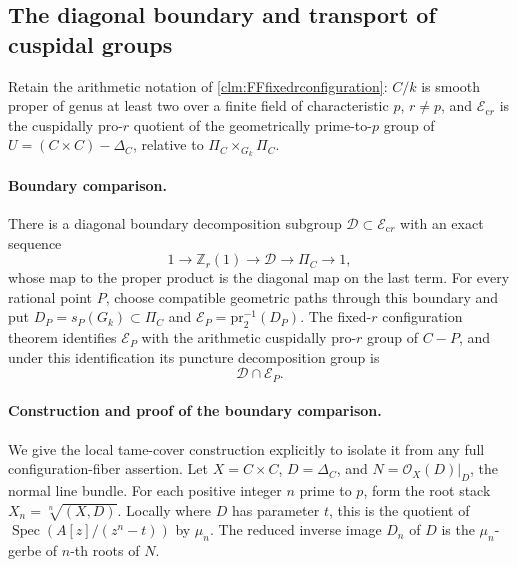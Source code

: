 \subsection{The diagonal boundary and transport of cuspidal groups}

Retain the arithmetic notation of
\ref{clm:FFfixedrconfiguration}: \(C/k\) is smooth proper
of genus at least two over a finite field of characteristic
\(p\), \(r\ne p\), and
\(\mathcal E_{\mathrm{c}r}\) is the cuspidally pro-\(r\)
quotient of the geometrically prime-to-\(p\) group of
\(U=(C\times C)-\Delta_C\), relative to
\(\Pi_C\times_{G_k}\Pi_C\).

\paragraph{Boundary comparison.}
There is a diagonal boundary decomposition subgroup
\(\mathcal D\subset\mathcal E_{\mathrm{c}r}\) with
an exact sequence
\[
 1\longrightarrow\mathbb Z_r(1)\longrightarrow\mathcal D
 \longrightarrow\Pi_C\longrightarrow1,
                                                        \tag{FB.1}
\]
whose map to the proper product is the diagonal map on
the last term. For every rational point \(P\), choose
compatible geometric paths through this boundary and put
\(D_P=s_P(G_k)\subset\Pi_C\) and
\(\mathcal E_P=\mathrm{pr}_2^{-1}(D_P)\).
The fixed-\(r\) configuration theorem identifies
\(\mathcal E_P\) with the arithmetic cuspidally
pro-\(r\) group of \(C-P\), and under this
identification its puncture decomposition group is
\[
                           \mathcal D\cap\mathcal E_P.
                                                        \tag{FB.2}
\]

\paragraph{Construction and proof of the boundary comparison.}
We give the local tame-cover construction explicitly to
isolate it from any full configuration-fiber assertion.
Let \(X=C\times C\), \(D=\Delta_C\), and
\(N=\mathcal O_X(D)|_D\), the normal line bundle.
For each positive integer \(n\) prime to \(p\), form
the root stack \(X_n=\sqrt[n]{(X,D)}\). Locally where
\(D\) has parameter \(t\), this is the quotient of
\(\operatorname{Spec}(A[z]/(z^n-t))\) by \(\mu_n\).
The reduced inverse image \(D_n\) of \(D\) is the
\(\mu_n\)-gerbe of \(n\)-th roots of \(N\).

